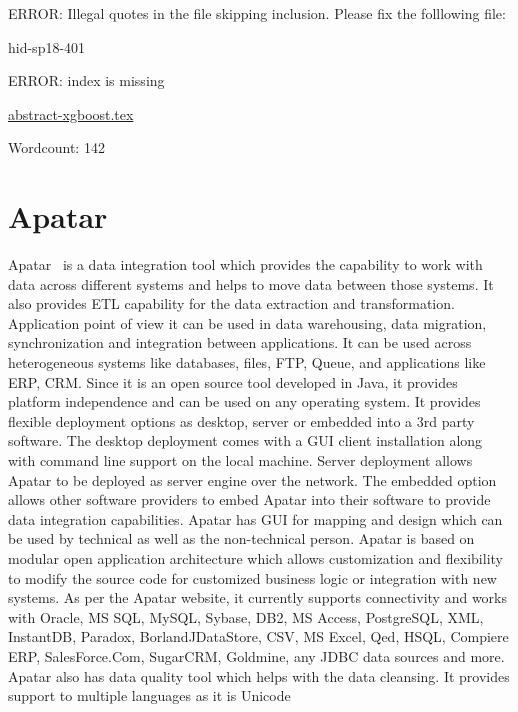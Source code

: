 ERROR: Illegal quotes in the file skipping inclusion. Please fix the folllowing file:

\begin{IU}

hid-sp18-401

ERROR: index is missing

\href{https://github.com/cloudmesh-community/hid-sp18-401/blob/master//technology/abstract-xgboost.tex}{abstract-xgboost.tex}

 

Wordcount: 142

\end{IU}

\section{Apatar}
Apatar~\cite{hid-sp18-402-www-apatar} is a data integration tool which
provides the capability to work with data across different systems and
helps to move data between those systems. It also provides ETL
capability for the data extraction and transformation. Application
point of view it can be used in data warehousing, data migration,
synchronization and integration between applications. It can be used
across heterogeneous systems like databases, files, FTP, Queue, and
applications like ERP, CRM. Since it is an open source tool developed
in Java, it provides platform independence and can be used on any
operating system. It provides flexible deployment options as desktop,
server or embedded into a 3rd party software. The desktop deployment
comes with a GUI client installation along with command line support
on the local machine. Server deployment allows Apatar to be deployed
as server engine over the network. The embedded option allows other
software providers to embed Apatar into their software to provide data
integration capabilities. Apatar has GUI for mapping and design which
can be used by technical as well as the non-technical person. Apatar
is based on modular open application architecture which allows
customization and flexibility to modify the source code for customized
business logic or integration with new systems. As per the Apatar
website, it currently supports connectivity and works with Oracle, MS
SQL, MySQL, Sybase, DB2, MS Access, PostgreSQL, XML, InstantDB,
Paradox, BorlandJDataStore, CSV, MS Excel, Qed, HSQL, Compiere ERP,
SalesForce.Com, SugarCRM, Goldmine, any JDBC data sources and
more. Apatar also has data quality tool which helps with the data
cleansing. It provides support to multiple languages as it is Unicode
